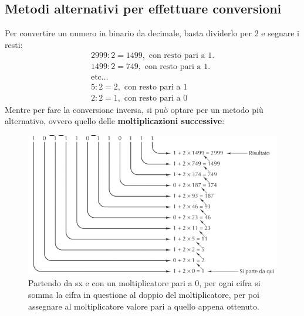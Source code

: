 \documentclass[12pt]{article}
\begin{document}
\subsection{Metodi alternativi per effettuare conversioni}
Per convertire un numero in binario da decimale, basta dividerlo per 2 e segnare i resti:
\begin{gather*}
    2999 : 2 = 1499, \text{ con resto pari a } 1.\\
    1499 : 2 = 749, \text{ con resto pari a } 1.\\
    \text{etc} \dots \\
    5 : 2 = 2, \text{ con resto pari a } 1\\
    2 : 2 = 1, \text{ con resto pari a } 0
\end{gather*}
Mentre per fare la conversione inversa, si può optare per un metodo più alternativo, ovvero quello delle \textbf{moltiplicazioni successive}:
\begin{figure}[!htb]
    \centering
    \includegraphics[width=.9\linewidth,height=.40\textheight,keepaspectratio]{rappresentazione_dati/mult_succ.PNG} %
    \begin{center}
        \caption{\label{fig:moltiplicazioni_successive}Partendo da sx e con un moltiplicatore pari a 0, per ogni cifra si somma la cifra in questione al doppio del moltiplicatore, per poi assegnare al moltiplicatore valore pari a quello appena ottenuto.}
    \end{center}
\end{figure}
\end{document}
